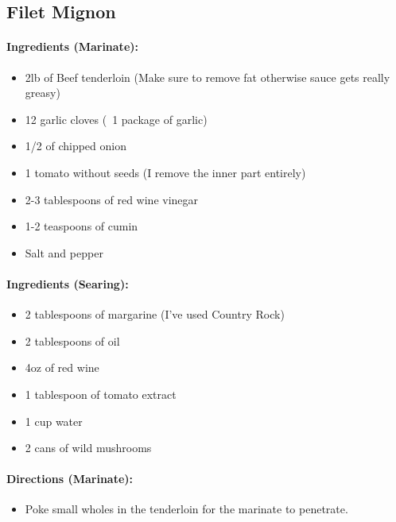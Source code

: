 \documentclass{article}
\begin{document}
\subsection{Filet Mignon} 

\paragraph{Ingredients (Marinate):}
\begin{itemize}
    \item 2lb of Beef tenderloin (Make sure to remove fat otherwise sauce gets really greasy)
    \item 12 garlic cloves (~1 package of garlic)
    \item 1/2 of chipped onion
    \item 1 tomato without seeds (I remove the inner part entirely)
    \item 2-3 tablespoons of red wine vinegar
    \item 1-2 teaspoons of cumin
    \item Salt and pepper
\end{itemize}  

\paragraph{Ingredients (Searing):}
\begin{itemize}
    \item 2 tablespoons of margarine (I've used Country Rock)
    \item 2 tablespoons of oil
    \item 4oz of red wine
    \item 1 tablespoon of tomato extract
    \item 1 cup water
    \item 2 cans of wild mushrooms
\end{itemize}  

\paragraph{Directions (Marinate):}
\begin{itemize}
    \item Poke small wholes in the tenderloin for the marinate to penetrate.
\end{itemize}  
\end{document}
